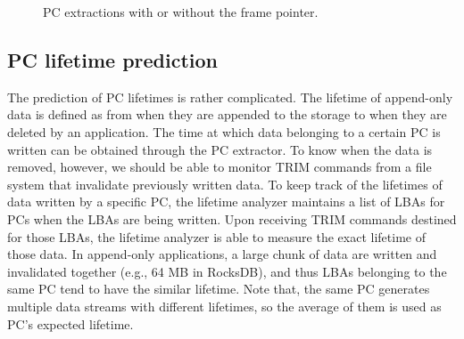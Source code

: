 \begin{figure}[t]
	\centering
	\vspace{-10pt}
	\hfill
	\vspace{-8pt}
	\caption{PC extractions with or without the frame pointer.}
	\label{fig:getpc}
	\vspace{-15pt}
\end{figure}


\vspace{-5pt}
\subsection{PC lifetime prediction}
The prediction of PC lifetimes is rather complicated. The lifetime of
append-only data is defined as from when they are appended to the storage to
when they are deleted by an application. The time at which data belonging to a
certain PC is written can be obtained through the PC extractor. To know when
the data is removed, however, we should be able to monitor TRIM commands from a
file system that invalidate previously written data.  To keep track of the
lifetimes of data written by a specific PC, the lifetime analyzer maintains a
list of LBAs for PCs when the LBAs are being written.  Upon receiving TRIM
commands destined for those LBAs, the lifetime analyzer is able to measure the
exact lifetime of those data. In append-only applications, a large chunk of
data are written and invalidated together (e.g., 64 MB in RocksDB), and thus
LBAs belonging to the same PC tend to have the similar lifetime. Note that, the
same PC generates multiple data streams with different lifetimes, so the
average of them is used as PC's expected lifetime.


